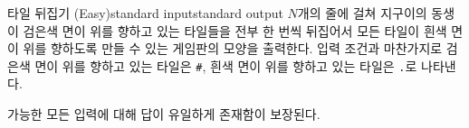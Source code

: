 \begin{problem}{타일 뒤집기 (Easy)}{standard input}{standard output}
\OutputFile
$N$개의 줄에 걸쳐 지구이의 동생이 검은색 면이 위를 향하고 있는 타일들을 전부 한 번씩 뒤집어서 모든 타일이 흰색 면이 위를 향하도록 만들 수 있는 게임판의 모양을 출력한다. 입력 조건과 마찬가지로 검은색 면이 위를 향하고 있는 타일은 \texttt{\#}, 흰색 면이 위를 향하고 있는 타일은 \texttt{.}로 나타낸다.

가능한 모든 입력에 대해 답이 유일하게 존재함이 보장된다.

\Example

\begin{example}
%
%
%
\end{example}

\end{problem}
